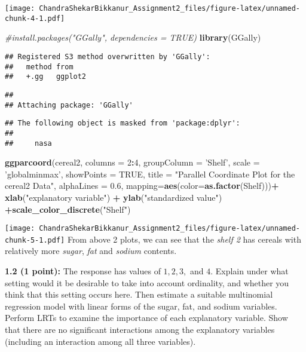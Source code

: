 \documentclass[]{article}
\newenvironment{Shaded}{\begin{snugshade}}{\end{snugshade}}
\newcommand{\CommentTok}[1]{\textcolor[rgb]{0.56,0.35,0.01}{\textit{#1}}}
\newcommand{\DataTypeTok}[1]{\textcolor[rgb]{0.13,0.29,0.53}{#1}}
\newcommand{\DecValTok}[1]{\textcolor[rgb]{0.00,0.00,0.81}{#1}}
\newcommand{\FloatTok}[1]{\textcolor[rgb]{0.00,0.00,0.81}{#1}}
\newcommand{\KeywordTok}[1]{\textcolor[rgb]{0.13,0.29,0.53}{\textbf{#1}}}
\newcommand{\NormalTok}[1]{#1}
\newcommand{\OperatorTok}[1]{\textcolor[rgb]{0.81,0.36,0.00}{\textbf{#1}}}
\newcommand{\OtherTok}[1]{\textcolor[rgb]{0.56,0.35,0.01}{#1}}
\newcommand{\StringTok}[1]{\textcolor[rgb]{0.31,0.60,0.02}{#1}}
\begin{document}
\texttt{[image: ChandraShekarBikkanur\_Assignment2\_files/figure-latex/unnamed-chunk-4-1.pdf]}

\begin{Shaded}
\begin{Highlighting}[]
\CommentTok{#install.packages("GGally", dependencies = TRUE)}
\KeywordTok{library}\NormalTok{(GGally)}
\end{Highlighting}
\end{Shaded}

\begin{verbatim}
## Registered S3 method overwritten by 'GGally':
##   method from   
##   +.gg   ggplot2
\end{verbatim}

\begin{verbatim}
## 
## Attaching package: 'GGally'
\end{verbatim}

\begin{verbatim}
## The following object is masked from 'package:dplyr':
## 
##     nasa
\end{verbatim}

\begin{Shaded}
\begin{Highlighting}[]
\KeywordTok{ggparcoord}\NormalTok{(cereal2, }\DataTypeTok{columns =} \DecValTok{2}\OperatorTok{:}\DecValTok{4}\NormalTok{, }\DataTypeTok{groupColumn =} \StringTok{'Shelf'}\NormalTok{, }\DataTypeTok{scale =} \StringTok{'globalminmax'}\NormalTok{, }\DataTypeTok{showPoints =} \OtherTok{TRUE}\NormalTok{, }\DataTypeTok{title =} \StringTok{"Parallel Coordinate Plot for the cereal2 Data"}\NormalTok{, }\DataTypeTok{alphaLines =} \FloatTok{0.6}\NormalTok{, }\DataTypeTok{mapping=}\KeywordTok{aes}\NormalTok{(}\DataTypeTok{color=}\KeywordTok{as.factor}\NormalTok{(Shelf)))}\OperatorTok{+}\StringTok{ }\KeywordTok{xlab}\NormalTok{(}\StringTok{"explanatory variable"}\NormalTok{) }\OperatorTok{+}\StringTok{ }\KeywordTok{ylab}\NormalTok{(}\StringTok{"standardized value"}\NormalTok{) }\OperatorTok{+}\KeywordTok{scale_color_discrete}\NormalTok{(}\StringTok{"Shelf"}\NormalTok{)}
\end{Highlighting}
\end{Shaded}

\texttt{[image: ChandraShekarBikkanur\_Assignment2\_files/figure-latex/unnamed-chunk-5-1.pdf]}
From above 2 plots, we can see that the \emph{shelf 2} has cereals with
relatively more \emph{sugar}, \emph{fat} and \emph{sodium} contents.

\textbf{1.2 (1 point):} The response has values of \(1, 2, 3,\) and
\(4\). Explain under what setting would it be desirable to take into
account ordinality, and whether you think that this setting occurs here.
Then estimate a suitable multinomial regression model with linear forms
of the sugar, fat, and sodium variables. Perform LRTs to examine the
importance of each explanatory variable. Show that there are no
significant interactions among the explanatory variables (including an
interaction among all three variables).
\end{document}
